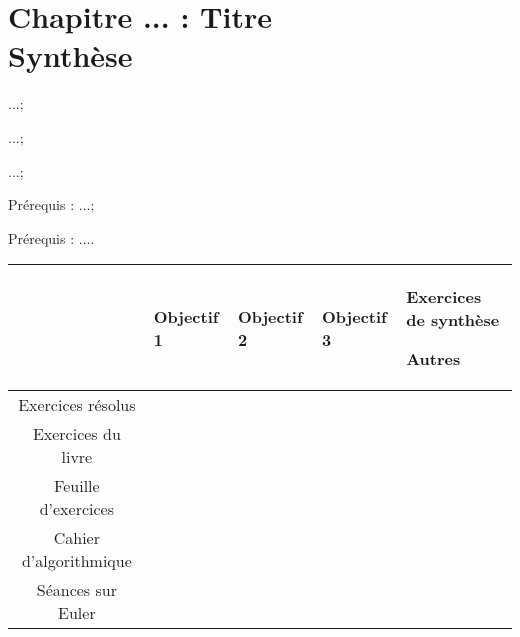 \documentclass[landscape,french,11pt]{report}
\begin{document}
\fancyhf{}
\ReglePied
\entete{}{}{}


\chapter{Chapitre ... : Titre \\ \Large Synthèse}

\thispagestyle{chapitre}
 \bigskip
\begin{multicols}{2}


 \begin{objectifs}
 \item ...;
 \item ...;
 \item ...;

\end{objectifs}

\begin{enligne}
\item Prérequis : ...;
\item Prérequis : ....
\end{enligne}

\end{multicols}

\begin{center}
\begin{tabular}{|m{4cm}|p{4cm}|p{4cm}|p{4cm}|p{4cm}|}
\cline{2-5} 
 \multicolumn{1}{c|}{}&  \multicolumn{1}{M{4cm}|}{Objectif 1} & \multicolumn{1}{M{4cm}|}{Objectif 2} & \multicolumn{1}{M{4cm}|}{Objectif 3} & \multicolumn{1}{M{4cm}|}{Exercices de synthèse \par Autres} \\ 
\hline 
\multicolumn{1}{|c|}{Exercices résolus}\par    & \vspace*{1.5cm} ~
 &  &  &  \\ 
\hline 
\multicolumn{1}{|c|}{Exercices du livre}  & \vspace*{1.5cm}~ & & & \\ 
\hline 
\multicolumn{1}{|c|}{Feuille d'exercices} &\vspace*{1.5cm}~    & & &  \\ 
\hline
\multicolumn{1}{|c|}{Cahier d'algorithmique}  & \vspace*{1.5cm}~  & & &  \\ 
\hline
\multicolumn{1}{|c|}{Séances sur Euler}  & \vspace*{1.5cm}~   &  &  &  \\ 
\hline 
\end{tabular} 

\end{center}
\end{document}
